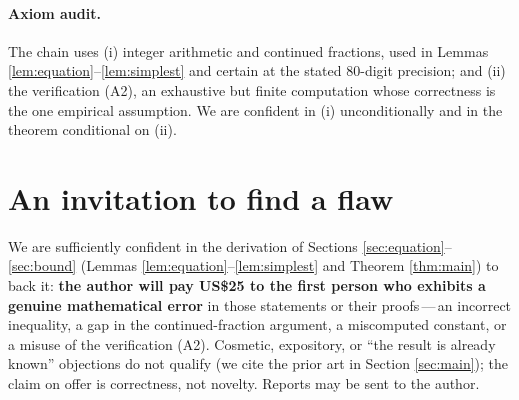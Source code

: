 \documentclass[11pt]{article}
\theoremstyle{definition}
\begin{document}
\paragraph{Axiom audit.} The chain uses (i) integer arithmetic and continued
fractions, used in Lemmas \ref{lem:equation}--\ref{lem:simplest} and certain at
the stated $80$-digit precision; and (ii) the verification (A2), an exhaustive
but finite computation whose correctness is the one empirical assumption. We are
confident in (i) unconditionally and in the theorem conditional on (ii).

\section{An invitation to find a flaw}\label{sec:prize}

We are sufficiently confident in the derivation of
Sections \ref{sec:equation}--\ref{sec:bound} (Lemmas
\ref{lem:equation}--\ref{lem:simplest} and Theorem \ref{thm:main}) to back it:
\textbf{the author will pay US\$25 to the first person who exhibits a genuine
mathematical error} in those statements or their proofs\,---\,an incorrect
inequality, a gap in the continued-fraction argument, a miscomputed constant, or
a misuse of the verification (A2). Cosmetic, expository, or
``the result is already known'' objections do not qualify (we cite the prior art
in Section \ref{sec:main}); the claim on offer is correctness, not novelty.
Reports may be sent to the author.
\end{document}
